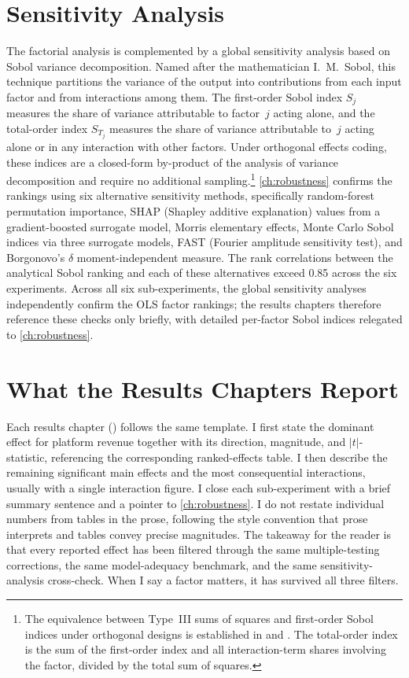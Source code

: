 \section{Sensitivity Analysis}
\label{sec:sensitivity_main}

The factorial analysis is complemented by a global sensitivity analysis based on Sobol variance decomposition. Named after the mathematician I.\ M.\ Sobol, this technique partitions the variance of the output into contributions from each input factor and from interactions among them. The first-order Sobol index $S_j$ measures the share of variance attributable to factor~$j$ acting alone, and the total-order index $S_{T_j}$ measures the share of variance attributable to~$j$ acting alone or in any interaction with other factors. Under orthogonal effects coding, these indices are a closed-form by-product of the analysis of variance decomposition and require no additional sampling.\footnote{The equivalence between Type~III sums of squares and first-order Sobol indices under orthogonal designs is established in \citet{ArcherSaltelliSobol1997} and \citet{Saltelli2008}. The total-order index is the sum of the first-order index and all interaction-term shares involving the factor, divided by the total sum of squares.} \cref{ch:robustness} confirms the rankings using six alternative sensitivity methods, specifically random-forest permutation importance, SHAP (Shapley additive explanation) values from a gradient-boosted surrogate model, Morris elementary effects, Monte Carlo Sobol indices via three surrogate models, FAST (Fourier amplitude sensitivity test), and Borgonovo's $\delta$ moment-independent measure. The rank correlations between the analytical Sobol ranking and each of these alternatives exceed 0.85 across the six experiments. Across all six sub-experiments, the global sensitivity analyses independently confirm the OLS factor rankings; the results chapters therefore reference these checks only briefly, with detailed per-factor Sobol indices relegated to \cref{ch:robustness}.

\section{What the Results Chapters Report}
\label{sec:ch4_summary}

Each results chapter () follows the same template. I first state the dominant effect for platform revenue together with its direction, magnitude, and $|t|$-statistic, referencing the corresponding ranked-effects table. I then describe the remaining significant main effects and the most consequential interactions, usually with a single interaction figure. I close each sub-experiment with a brief summary sentence and a pointer to \cref{ch:robustness}. I do not restate individual numbers from tables in the prose, following the style convention that prose interprets and tables convey precise magnitudes. The takeaway for the reader is that every reported effect has been filtered through the same multiple-testing corrections, the same model-adequacy benchmark, and the same sensitivity-analysis cross-check. When I say a factor matters, it has survived all three filters.
